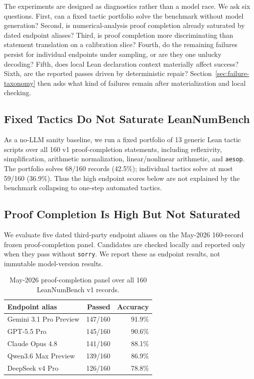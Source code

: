 \documentclass{article}
\begin{document}
The experiments are designed as diagnostics rather than a model race. We ask
six questions. First, can a fixed tactic portfolio solve the benchmark without
model generation? Second, is numerical-analysis proof completion already
saturated by dated endpoint aliases? Third, is proof completion more
discriminating than statement translation on a calibration slice? Fourth, do
the remaining failures persist for individual endpoints under sampling, or are
they one unlucky decoding? Fifth, does local Lean declaration context
materially affect success? Sixth, are the reported passes driven by
deterministic repair? Section~\ref{sec:failure-taxonomy} then asks what kind
of failures remain after materialization and local checking.

\subsection{Fixed Tactics Do Not Saturate LeanNumBench}

As a no-LLM sanity baseline, we run a fixed portfolio of 13 generic Lean tactic
scripts over all 160 v1 proof-completion statements, including reflexivity,
simplification, arithmetic normalization, linear/nonlinear arithmetic, and
\texttt{aesop}. The portfolio solves 68/160 records (42.5\%); individual
tactics solve at most 59/160 (36.9\%). Thus the high endpoint scores
below are not explained by the benchmark collapsing to one-step automated
tactics.

\subsection{Proof Completion Is High But Not Saturated}

We evaluate five dated third-party endpoint aliases on the May-2026
160-record frozen proof-completion panel. Candidates are checked locally and
reported only when they pass without \texttt{sorry}. We report these as
endpoint results, not immutable model-version results.

\begin{table}[H]
\centering
\caption{May-2026 proof-completion panel over all 160 LeanNumBench v1 records.}
\label{tab:proof-snapshot}
\small
\begin{tabular}{lrr}
\toprule
Endpoint alias & Passed & Accuracy\\
\midrule
Gemini 3.1 Pro Preview & 147/160 & 91.9\%\\
GPT-5.5 Pro & 145/160 & 90.6\%\\
Claude Opus 4.8 & 141/160 & 88.1\%\\
Qwen3.6 Max Preview & 139/160 & 86.9\%\\
DeepSeek v4 Pro & 126/160 & 78.8\%\\
\bottomrule
\end{tabular}
\end{table}
\end{document}
